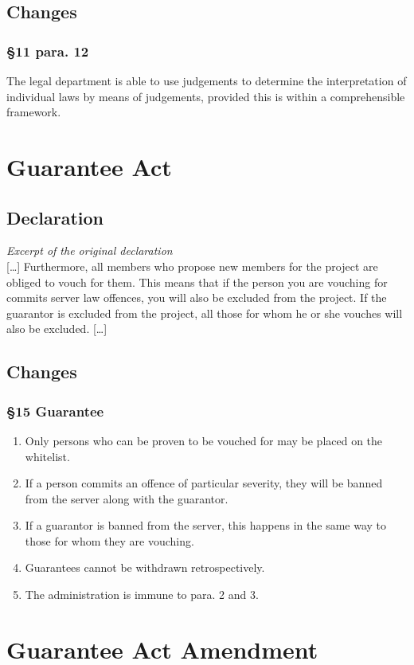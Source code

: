 \documentclass{cjs9}
\begin{document}
\subsection{Changes}
\subsubsection*{§11 para. 12}
The legal department is able to use judgements to determine the interpretation of
individual laws by means of judgements, provided this is within a comprehensible
framework.
\newpage
\section{Guarantee Act}
\subsection{Declaration}
\textit{Excerpt of the original declaration\\}
[\dots] Furthermore, all members who propose new members for the project are obliged to vouch for them. This means that if the person you are vouching for commits server law offences, you will also be excluded from the project. If the guarantor is excluded from the project, all those for whom he or she vouches will also be excluded. [\dots]
\subsection{Changes}
\subsubsection*{§15 Guarantee}
\begin{enumerate}[(1)]
    \item Only persons who can be proven to be vouched for may be placed on the whitelist.
    \item If a person commits an offence of particular severity, they will be banned from the server along with the guarantor.
    \item If a guarantor is banned from the server, this happens in the same way to those for whom they are vouching.
    \item Guarantees cannot be withdrawn retrospectively.
    \item The administration is immune to para. 2 and 3.
\end{enumerate}
\newpage
\section{Guarantee Act Amendment}
\end{document}
